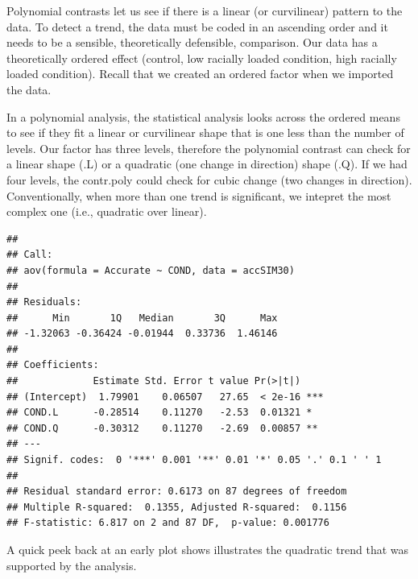 \documentclass[
  english,
]{book}
\newenvironment{Shaded}{\begin{snugshade}}{\end{snugshade}}
\newcommand{\DataTypeTok}[1]{\textcolor[rgb]{0.13,0.29,0.53}{#1}}
\newcommand{\DecValTok}[1]{\textcolor[rgb]{0.00,0.00,0.81}{#1}}
\newcommand{\KeywordTok}[1]{\textcolor[rgb]{0.13,0.29,0.53}{\textbf{#1}}}
\newcommand{\NormalTok}[1]{#1}
\newcommand{\OperatorTok}[1]{\textcolor[rgb]{0.81,0.36,0.00}{\textbf{#1}}}
\newcommand{\StringTok}[1]{\textcolor[rgb]{0.31,0.60,0.02}{#1}}
\begin{document}
Polynomial contrasts let us see if there is a linear (or curvilinear) pattern to the data. To detect a trend, the data must be coded in an ascending order and it needs to be a sensible, theoretically defensible, comparison. Our data has a theoretically ordered effect (control, low racially loaded condition, high racially loaded condition). Recall that we created an ordered factor when we imported the data.

In a polynomial analysis, the statistical analysis looks across the ordered means to see if they fit a linear or curvilinear shape that is one less than the number of levels. Our factor has three levels, therefore the polynomial contrast can check for a linear shape (.L) or a quadratic (one change in direction) shape (.Q). If we had four levels, the contr.poly could check for cubic change (two changes in direction). Conventionally, when more than one trend is significant, we intepret the most complex one (i.e., quadratic over linear).

\begin{Shaded}
\end{Shaded}

\begin{verbatim}
## 
## Call:
## aov(formula = Accurate ~ COND, data = accSIM30)
## 
## Residuals:
##      Min       1Q   Median       3Q      Max 
## -1.32063 -0.36424 -0.01944  0.33736  1.46146 
## 
## Coefficients:
##             Estimate Std. Error t value Pr(>|t|)    
## (Intercept)  1.79901    0.06507   27.65  < 2e-16 ***
## COND.L      -0.28514    0.11270   -2.53  0.01321 *  
## COND.Q      -0.30312    0.11270   -2.69  0.00857 ** 
## ---
## Signif. codes:  0 '***' 0.001 '**' 0.01 '*' 0.05 '.' 0.1 ' ' 1
## 
## Residual standard error: 0.6173 on 87 degrees of freedom
## Multiple R-squared:  0.1355, Adjusted R-squared:  0.1156 
## F-statistic: 6.817 on 2 and 87 DF,  p-value: 0.001776
\end{verbatim}

A quick peek back at an early plot shows illustrates the quadratic trend that was supported by the analysis.
\end{document}
